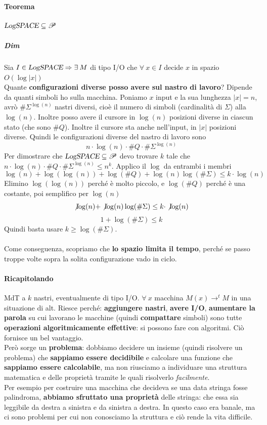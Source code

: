 \documentclass[10pt]{book}
\begin{document}
\paragraph{Teorema} $\textsl{LogSPACE} \subseteq \mathscr{P}$
\subparagraph{Dim} Sia $I \in \textsl{LogSPACE} \Rightarrow \exists\: M$ di tipo I/O che $\forall\:x\in I$ decide $x$ in spazio $O(\log|x|)$\\
Quante \textbf{configurazioni diverse posso avere sul nastro di lavoro}? Dipende da quanti simboli ho sulla macchina. Poniamo $x$ input e la sua lunghezza $|x| = n$, avrò $\#\Sigma^{\log(n)}$ nastri diversi, cioè il numero di simboli (cardinalità di $\Sigma$) alla $\log (n)$. Inoltre posso avere il cursore in $\log(n)$ posizioni diverse in ciascun stato (che sono $\# Q$). Inoltre il cursore sta anche nell'input, in $|x|$ posizioni diverse. Quindi le configurazioni diverse del nastro di lavoro sono 
$$n\cdot\log(n)\cdot\# Q\cdot\#\Sigma^{\log(n)}$$
Per dimostrare che $\textsl{LogSPACE} \subseteq \mathscr{P}$ devo trovare $k$ tale che $n\cdot\log(n)\cdot\# Q\cdot\#\Sigma^{\log(n)} \leq n^k$. Applico il $\log$ da entrambi i membri
$$\log(n) + \log(\log(n)) + \log(\# Q) + \log(n)\log(\#\Sigma) \leq k\cdot\log(n)$$
Elimino $\log(\log(n))$ perché è molto piccolo, e $\log(\# Q)$ perché è una costante, poi semplifico per $\log(n)$
$$\not\log(n) + \not\log(n)\log(\#\Sigma) \leq k\cdot\not\log(n)$$
$$1 + \log(\#\Sigma) \leq k$$
Quindi basta usare $k \geq \log(\#\Sigma)$.\\\\
Come conseguenza, scopriamo che \textbf{lo spazio limita il tempo}, perché se passo troppe volte sopra la solita configurazione vado in ciclo.
\paragraph{Ricapitolando} MdT a $k$ nastri, eventualmente di tipo I/O. $\forall\:x$ macchina $M(x) \rightarrow^t M$ in una situazione di alt.
Riesce perché: \textbf{aggiungere nastri}, \textbf{avere I/O}, \textbf{aumentare la parola} su cui lavorano le macchine (quindi \textbf{compattare} simboli) sono tutte \textbf{operazioni algoritmicamente effettive}: si possono fare con algoritmi. Ciò fornisce un bel vantaggio.\\
Però sorge un \textbf{problema}: dobbiamo decidere un insieme (quindi risolvere un problema) che \textbf{sappiamo essere decidibile} e calcolare una funzione che \textbf{sappiamo essere calcolabile}, ma non riusciamo a individuare una struttura matematica e delle proprietà tramite le quali risolverlo \textit{facilmente}.\\
Per esempio per costruire una macchina che decideva se una data stringa fosse palindroma, \textbf{abbiamo sfruttato una proprietà} delle stringa: che essa sia leggibile da destra a sinistra e da sinistra a destra. In questo caso era banale, ma ci sono problemi per cui non conosciamo la struttura e ciò rende la vita difficile.
\end{document}
